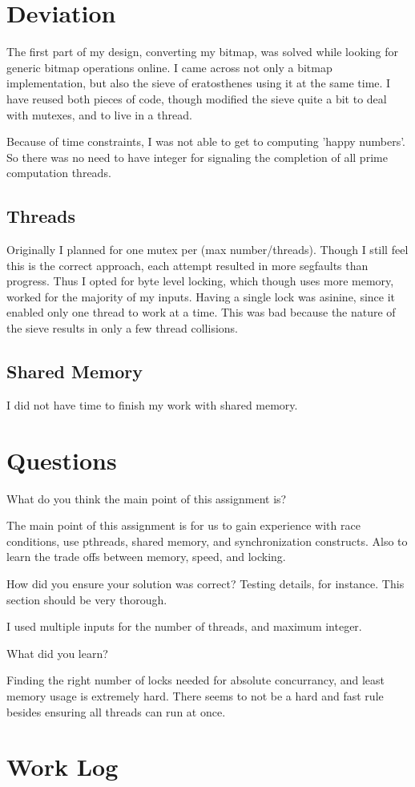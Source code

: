 \documentclass[letterpaper,10pt]{article}
\begin{document}
\section{Deviation}
The first part of my design, converting my bitmap, was solved while
looking for generic bitmap operations online. I came across not only a
bitmap implementation, but also the sieve of eratosthenes using it at
the same time. I have reused both pieces of code, though modified the
sieve quite a bit to deal with mutexes, and to live in a thread.

Because of time constraints, I was not able to get to computing 'happy
numbers'. So there was no need to have integer for signaling the
completion of all prime computation threads.

\subsection{Threads}
Originally I planned for one mutex per (max number/threads). Though I
still feel this is the correct approach, each attempt resulted in more
segfaults than progress. Thus I opted for byte level locking, which
though uses more memory, worked for the majority of my inputs. Having a
single lock was asinine, since it enabled only one thread to work at a
time. This was bad because the nature of the sieve results in only a
few thread collisions.

\subsection{Shared Memory}

I did not have time to finish my work with shared memory.

\section{Questions}
\begin{description}
  \item  What do you think the main point of this assignment is?

         The main point of this assignment is for us to gain experience
         with race conditions, use pthreads, shared memory, and
         synchronization constructs. Also to learn the trade offs
         between memory, speed, and locking.

  \item  How did you ensure your solution was correct? Testing details, for
         instance. This section should be very thorough.

         I used multiple inputs for the number of threads, and maximum
         integer.

  \item  What did you learn?

         Finding the right number of locks needed for absolute
         concurrancy, and least memory usage is extremely hard. There
         seems to not be a hard and fast rule besides ensuring all
         threads can run at once.

\end{description}

\newpage

\section{Work Log}


\end{document}
